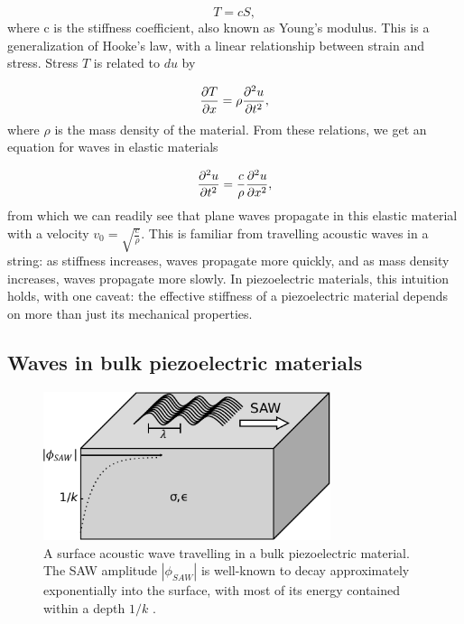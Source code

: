 \documentclass[double,12pt,1in]{beavtex}
\begin{document}
\begin{equation}
    T = cS, \label{elastic Hooke's}
\end{equation}
where c is the stiffness coefficient, also known as Young's modulus. This is a generalization of Hooke's law, with a linear relationship between strain and stress. Stress $T$ is related to $du$ by 

\begin{equation}
    \pdv{T}{x} = \rho \pdv[2]{u}{t}, \label{stress related to displacement}
\end{equation}
where $\rho$ is the mass density of the material. From these relations, we get an equation for waves in elastic materials

\begin{equation}
    \pdv[2]{u}{t} = \frac{c}{\rho} \pdv[2]{u}{x},
\end{equation}
from which we can readily see that plane waves propagate in this elastic material with a velocity $v_0 = \sqrt{\frac{c}{\rho}}$. This is familiar from travelling acoustic waves in a string: as stiffness increases, waves propagate more quickly, and as mass density increases, waves propagate more slowly. In piezoelectric materials, this intuition holds, with one caveat: the effective stiffness of a piezoelectric material depends on more than just its mechanical properties.

\subsection{Waves in bulk piezoelectric materials}
\begin{figure}
    \includegraphics[width=0.75\textwidth]{SAW in bulk semi.pdf}
    \caption{A surface acoustic wave travelling in a bulk piezoelectric material. The SAW amplitude $|\phi_{SAW}|$ is well-known to decay approximately exponentially into the surface, with most of its energy contained within a depth $1/k$ \cite{wixforth_surface_1989}.}
    \label{SAWbulksemi}
\end{figure}
\end{document}
